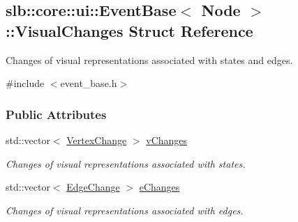 \hypertarget{structslb_1_1core_1_1ui_1_1EventBase_1_1VisualChanges}{}\subsection{slb\+:\+:core\+:\+:ui\+:\+:Event\+Base$<$ Node $>$\+:\+:Visual\+Changes Struct Reference}
\label{structslb_1_1core_1_1ui_1_1EventBase_1_1VisualChanges}


Changes of visual representations associated with states and edges.  




{\ttfamily \#include $<$event\+\_\+base.\+h$>$}

\subsubsection*{Public Attributes}
\begin{DoxyCompactItemize}
\item 
std\+::vector$<$ \hyperlink{structslb_1_1core_1_1ui_1_1EventBase_1_1VertexChange}{Vertex\+Change} $>$ \hyperlink{structslb_1_1core_1_1ui_1_1EventBase_1_1VisualChanges_abe83370d0f1380d85435becabb36fdde}{v\+Changes}\hypertarget{structslb_1_1core_1_1ui_1_1EventBase_1_1VisualChanges_abe83370d0f1380d85435becabb36fdde}{}\label{structslb_1_1core_1_1ui_1_1EventBase_1_1VisualChanges_abe83370d0f1380d85435becabb36fdde}

\begin{DoxyCompactList}\small\item\em Changes of visual representations associated with states. \end{DoxyCompactList}\item 
std\+::vector$<$ \hyperlink{structslb_1_1core_1_1ui_1_1EventBase_1_1EdgeChange}{Edge\+Change} $>$ \hyperlink{structslb_1_1core_1_1ui_1_1EventBase_1_1VisualChanges_a98cb932610eb375e5176401f3a7b71e3}{e\+Changes}\hypertarget{structslb_1_1core_1_1ui_1_1EventBase_1_1VisualChanges_a98cb932610eb375e5176401f3a7b71e3}{}\label{structslb_1_1core_1_1ui_1_1EventBase_1_1VisualChanges_a98cb932610eb375e5176401f3a7b71e3}

\begin{DoxyCompactList}\small\item\em Changes of visual representations associated with edges. \end{DoxyCompactList}\end{DoxyCompactItemize}


